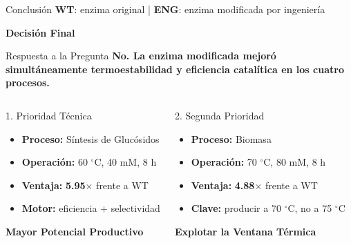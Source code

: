 \begin{frame}[label=conclusion]{Conclusión \hfill{\tiny\color{TextoSuave}\textbf{WT}: enzima original \quad | \quad \textbf{ENG}: enzima modificada por ingeniería}}

{\color{Cian}\bfseries Decisión Final}

\vspace{0.04cm}

\begin{alertblock}{Respuesta a la Pregunta}
\centering
\scriptsize\bfseries
No. La enzima modificada mejoró simultáneamente
\textbf{termoestabilidad y eficiencia catalítica}
en los cuatro procesos.
\end{alertblock}

\vspace{0.04cm}

\begin{columns}[T,onlytextwidth]


\begin{block}{1. Prioridad Técnica}
\scriptsize

\begin{itemize}
    \item \textbf{Proceso:} Síntesis de Glucósidos
    \item \textbf{Operación:} 60 $^{\circ}$C, 40 mM, 8 h
    \item \textbf{Ventaja:} \textbf{5.95$\times$} frente a WT
    \item \textbf{Motor:} eficiencia + selectividad
\end{itemize}

\centering
{\color{CianClaro}\bfseries Mayor Potencial Productivo}
\end{block}



\begin{block}{2. Segunda Prioridad}
\scriptsize

\begin{itemize}
    \item \textbf{Proceso:} Biomasa
    \item \textbf{Operación:} 70 $^{\circ}$C, 80 mM, 8 h
    \item \textbf{Ventaja:} \textbf{4.88$\times$} frente a WT
    \item \textbf{Clave:} producir a 70 $^{\circ}$C, no a 75 $^{\circ}$C
\end{itemize}

\centering
{\color{CianClaro}\bfseries Explotar la Ventana Térmica}
\end{block}


\end{columns}
\end{frame}

